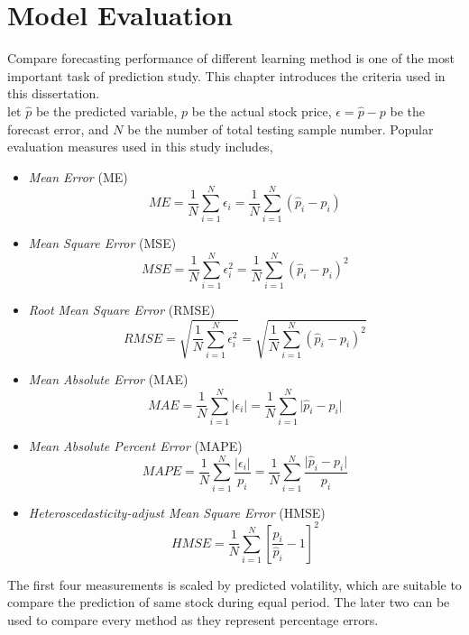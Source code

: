 \chapter{Model Evaluation}
\label{ch:modelEval}

Compare forecasting performance of different learning method is one of the most important task of prediction study. This chapter introduces the criteria used in this dissertation.\\


let $ \hat{p} $ be the predicted variable, $ p $ be the actual stock price, $ \epsilon = \hat{p} - p $ be the forecast error, and $ N $ be the number of total testing sample number. Popular evaluation measures used in this study includes\cite[Section~2.2, p.~23--24]{poon2005practical},
\begin{itemize}
	\item \textit{Mean Error} (ME)
	\begin{equation}
	ME=\frac{1}{N} \sum_{i=1}^{N}\epsilon_i=\frac{1}{N} \sum_{i=1}^{N} (\hat{p}_i - p_i)
	\end{equation}
	
	\item \textit{Mean Square Error} (MSE)
	\begin{equation}
	MSE = \frac{1}{N} \sum_{i=1}^{N}\epsilon_i^2=\frac{1}{N} \sum_{i=1}^{N} (\hat{p}_i - p_i)^2
	\end{equation}
	
	\item \textit{Root Mean Square Error} (RMSE)
	\begin{equation}
	RMSE = \sqrt{\frac{1}{N} \sum_{i=1}^{N}\epsilon_i^2}=\sqrt{\frac{1}{N} \sum_{i=1}^{N} (\hat{p}_i - p_i)^2}
	\end{equation}
	
	\item \textit{Mean Absolute Error} (MAE)
	\begin{equation}
	MAE=\frac{1}{N} \sum_{i=1}^{N} \lvert \epsilon_i \rvert =\frac{1}{N} \sum_{i=1}^{N} \lvert \hat{p}_i - p_i \rvert
	\end{equation}
	
	\item \textit{Mean Absolute Percent Error} (MAPE)
	\begin{equation}
	MAPE=\frac{1}{N} \sum_{i=1}^{N} \frac{\lvert \epsilon_i \rvert}{p_i} =\frac{1}{N} \sum_{i=1}^{N} \frac{\lvert \hat{p}_i - p_i \rvert}{p_i}
	\end{equation}
	
	\item \textit{Heteroscedasticity-adjust Mean Square Error} (HMSE)
	\begin{equation}
	HMSE=\frac{1}{N} \sum_{i=1}^{N}[\frac{p_i}{\hat{p}_i}- 1]^2
	\end{equation}
\end{itemize}
The first four measurements is scaled by predicted volatility, which are suitable to compare the prediction of same stock during equal period. The later two can be used to compare every method as they represent percentage errors.\\


